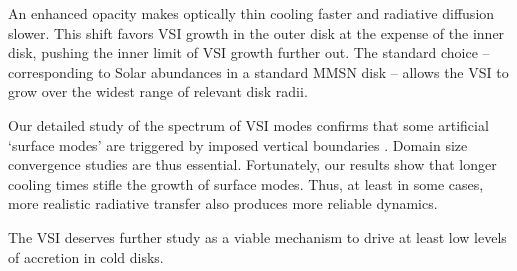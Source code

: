  An enhanced opacity makes optically thin cooling faster and radiative diffusion slower.  This shift favors VSI growth 
 in the outer disk at the expense of the inner disk, pushing the inner limit of VSI growth further out.
 The standard choice -- corresponding to Solar abundances in a standard MMSN disk -- allows the VSI 
 to grow over the widest range of relevant disk radii.
 
 Our detailed study of the spectrum of VSI modes confirms that some artificial `surface modes' are 
 triggered by imposed vertical boundaries .  Domain size
 convergence studies are thus essential.  Fortunately, our results show that longer cooling times 
  stifle the growth of surface modes.  Thus, at least in some cases, more realistic radiative transfer also produces more reliable dynamics.
 
 The VSI deserves further study as a viable mechanism to drive at least low levels of accretion in cold disks.
 



